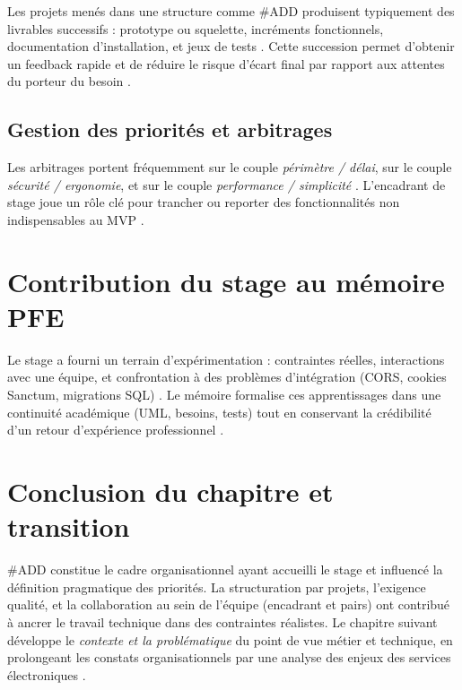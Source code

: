 Les projets menés dans une structure comme \#ADD produisent typiquement des livrables successifs : prototype ou squelette, incréments fonctionnels, documentation d'installation, et jeux de tests \cite{sommerville2016}. Cette succession permet d'obtenir un feedback rapide et de réduire le risque d'écart final par rapport aux attentes du porteur du besoin \cite{pressman2014}.

\subsection{Gestion des priorités et arbitrages}

Les arbitrages portent fréquemment sur le couple \emph{périmètre / délai}, sur le couple \emph{sécurité / ergonomie}, et sur le couple \emph{performance / simplicité} \cite{bass2021,iso25010}. L'encadrant de stage joue un rôle clé pour trancher ou reporter des fonctionnalités non indispensables au MVP \cite{sommerville2016}.

\section{Contribution du stage au mémoire PFE}

Le stage a fourni un terrain d'expérimentation : contraintes réelles, interactions avec une équipe, et confrontation à des problèmes d'intégration (CORS, cookies Sanctum, migrations SQL) \cite{laraveldoc,reactdoc}. Le mémoire formalise ces apprentissages dans une continuité académique (UML, besoins, tests) tout en conservant la crédibilité d'un retour d'expérience professionnel \cite{booch2005,ieee1012}.

\section{Conclusion du chapitre et transition}

\#ADD constitue le cadre organisationnel ayant accueilli le stage et influencé la définition pragmatique des priorités. La structuration par projets, l'exigence qualité, et la collaboration au sein de l'équipe (encadrant et pairs) ont contribué à ancrer le travail technique dans des contraintes réalistes. Le chapitre suivant développe le \emph{contexte et la problématique} du point de vue métier et technique, en prolongeant les constats organisationnels par une analyse des enjeux des services électroniques \cite{fielding2000,bass2021}.